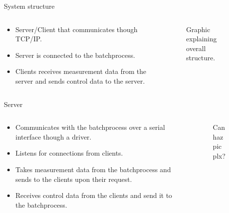 \documentclass{beamer}
\begin{document}
\begin{frame}{System structure}
\begin{columns}[T]
    \begin{column}{.55\textwidth}
        \begin{itemize}
            \item Server/Client that communicates though TCP/IP.
            \item Server is connected to the batchprocess.
            \item Clients receives measurement data from the server and sends control data to the server.
        \end{itemize}
    \end{column}
    \begin{column}{.45\textwidth}

        \begin{figure}[H]
           \centering
           	Graphic explaining overall structure.
        \end{figure}

    \end{column}
\end{columns}
\end{frame}

\begin{frame}{Server}
\begin{columns}[T]
    \begin{column}{.55\textwidth}
        \begin{itemize}
            \item Communicates with the batchprocess over a serial interface though a driver.
            \item Listens for connections from clients.
            \item Takes measurement data from the batchprocess and sends to the clients upon their request.
            	\item Receives control data from the clients and send it to the batchprocess.
        \end{itemize}
    \end{column}
    \begin{column}{.45\textwidth}

        \begin{figure}[H]
           \centering
           	Can haz pic plx?
        \end{figure}

    \end{column}
\end{columns}
\end{frame}
\end{document}
